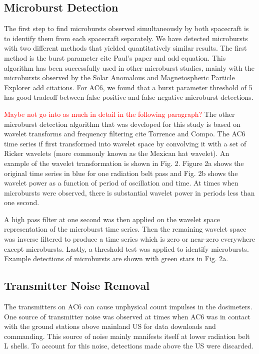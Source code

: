 \documentclass[draft]{agujournal2019}
\begin{document}
\subsection{Microburst Detection}
The first step to find microbursts observed simultaneously by both spacecraft is to identify them from each spacecraft separately. We have detected microbursts with two different methods that yielded quantitatively similar results. The first method is the burst parameter cite Paul’s paper and add equation. This algorithm has been successfully used in other microburst studies, mainly with the microbursts observed by the Solar Anomalous and Magnetospheric Particle Explorer add citations. For AC6, we found that a burst parameter threshold of 5 has good tradeoff between false positive and false negative microburst detections.

\textcolor{red}{Maybe not go into as much in detail in the following paragraph?} The other microburst detection algorithm that was developed for this study is based on wavelet transforms and frequency filtering cite Torrence and Compo. The AC6 time series if first transformed into wavelet space by convolving it with a set of Ricker wavelets (more commonly known as the Mexican hat wavelet). An example of the wavelet transformation is shown in Fig. 2. Figure 2a shows the original time series in blue for one radiation belt pass and Fig. 2b shows the wavelet power as a function of period of oscillation and time. At times when microbursts were observed, there is substantial wavelet power in periods less than one second.

A high pass filter at one second was then applied on the wavelet space representation of the microburst time series. Then the remaining wavelet space was inverse filtered to produce a time series which is zero or near-zero everywhere except microbursts. Lastly, a threshold test was applied to identify microbursts. Example detections of microbursts are shown with green stars in Fig. 2a.

\subsection{Transmitter Noise Removal}
The transmitters on AC6 can cause unphysical count impulses in the dosimeters. One source of transmitter noise was observed at times when AC6 was in contact with the ground stations above mainland US for data downloads and commanding. This source of noise mainly manifests itself at lower radiation belt L shells. To account for this noise, detections made above the US were discarded.
\end{document}
